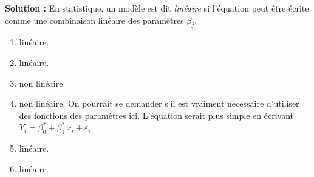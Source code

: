 \documentclass[letter, 11pt]{article}
\newcommand{\prof}[1]{\ifdefined\avecsolutions\par{\color{blue}\textbf{Solution :} #1}\par\fi}
\begin{document}
\begin{enumerate}[leftmargin=*, wide, label=\bf Exercice \arabic*:]
\prof{ En statistique, un modèle est dit {\it linéaire} si l'équation peut être écrite comme une combinaison linéaire des paramètres $\beta_j$.
\begin{enumerate}
\item linéaire. 
\item linéaire. %
\item non linéaire.
\item non linéaire. On pourrait se demander s'il est vraiment nécessaire d'utiliser des fonctions des paramètres ici. L'équation serait plus simple en écrivant $Y_i=\beta_0^*+\beta_1^*\,x_i+\varepsilon_i$.
\item linéaire.
\item linéaire.
\end{enumerate}}

\end{enumerate}
\end{document}
